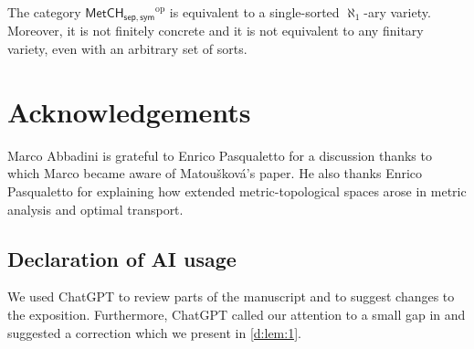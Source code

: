 \documentclass[11pt]{amsart}
\theoremstyle{definition}
\newcommand{\cat}[1]{\mathsf{#1}}
\newcommand{\op}{\mathrm{op}}
\newcommand{\MetCHsepsym}{\cat{MetCH_{sep,sym}}}
\begin{document}
\begin{corollary}
  \label{cor:symmetric}
  The category \(\MetCHsepsym^{\op}\) is equivalent to a single-sorted \(\aleph _1\)-ary variety. Moreover, it is not finitely concrete and it is not equivalent to any finitary variety, even with an arbitrary set of sorts.
\end{corollary}

\makeatletter
\begingroup
\let\addcontentsline\@gobblethree
\section*{Acknowledgements}
Marco Abbadini is grateful to Enrico Pasqualetto for a discussion thanks to which Marco became aware of Matoušková's paper.
He also thanks Enrico Pasqualetto for explaining how extended metric-topological spaces arose in metric analysis and optimal transport.

\subsection*{Declaration of AI usage}
We used ChatGPT to review parts of the manuscript and to suggest changes to the exposition. Furthermore, ChatGPT called our attention to a small gap in \cite{Mat00} and suggested a correction which we present in \cref{d:lem:1}.

\endgroup
\makeatother

\makeatletter
\begingroup
\let\addcontentsline\@gobblethree

\endgroup
\makeatother
\end{document}
